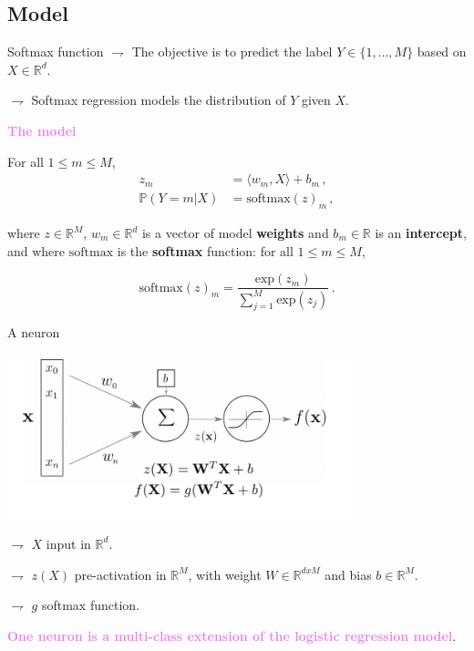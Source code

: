 \documentclass[9pt]{beamer}
\newcommand\R{\mathds{R}}
\renewcommand{\P}{\mathds{P}}
\begin{document}
\subsection{Model}

\begin{frame}{Softmax function}
$\rightharpoondown$ The objective is to \alert{predict the  label $Y\in\{1, \ldots, M\}$} based on $X\in\mathbb{R}^d$.

$\rightharpoondown$ Softmax regression \alert{models the distribution of $Y$ given $X$}.

\vspace{.3cm}

{\bf\textcolor{violet}{The model}} 

For all $1\leqslant m\leqslant M$,
\begin{align*}
z_m &= \langle w_m,X \rangle + b_m\,,\\
\P(Y = m| X) &= \mathrm{softmax}(z)_m\,,
\end{align*}

where $z\in\R^M$, $w_m \in \R^d$ is a vector of model \textbf{weights} and $b_m \in \R$ is an \textbf{intercept}, and where $\mathrm{softmax}$ is the \textbf{softmax} function: for all $1\leqslant m\leqslant M$,

$$
\mathrm{softmax}(z)_m = \frac{\mathrm{exp}(z_m)}{\sum_{j=1}^{M}\mathrm{exp}(z_j)}\,.
$$

\end{frame}

\begin{frame}{A neuron}

\begin{center}
\includegraphics[width = 0.75\textwidth]{neuron.png}
\end{center}

$\rightharpoondown$ $X$ \alert{input in $\R^d$}.

$\rightharpoondown$ $z(X)$ \alert{pre-activation in $\R^M$}, with \alert{weight $W\in\R^{dxM}$} and \alert{bias $b\in\R^M$}.

$\rightharpoondown$ $g$ \alert{softmax function}.

\vspace{.3cm}

{\bf\textcolor{violet}{One neuron is a multi-class extension of the logistic regression model}}. 

\end{frame}
\end{document}
